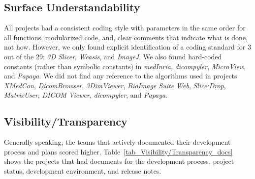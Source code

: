 \documentclass[final, 12pt, 3p, times]{elsarticle}
\begin{document}
\subsection{Surface Understandability} \label{sec_result_understandability}

All projects had a consistent coding style with parameters in
the same order for all functions, modularized code, and, clear comments that
indicate what is done, not how. However, we only found explicit identification
of a coding standard for 3 out of the 29: \textit{3D Slicer}, \textit{Weasis},
and \textit{ImageJ}. We also found hard-coded constants (rather than symbolic
constants) in \textit{medInria}, \textit{dicompyler}, \textit{MicroView}, and
\textit{Papaya}. We did not find any reference to the algorithms used in
projects \textit{XMedCon}, \textit{DicomBrowser}, \textit{3DimViewer},
\textit{BioImage Suite Web}, \textit{Slice:Drop}, \textit{MatrixUser},
\textit{DICOM Viewer}, \textit{dicompyler}, and \textit{Papaya}. 

\subsection{Visibility/Transparency} \label{sec_result_visibility_transparency}

Generally speaking, the teams that actively documented
their development process and plans scored higher.
Table~\ref{tab_Visibility/Transparency_docs} shows the projects that had
documents for the development process, project status, development environment,
and release notes.
\end{document}
